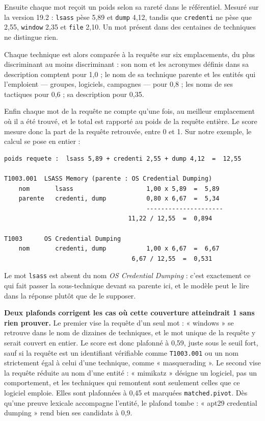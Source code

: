 Ensuite chaque mot reçoit un poids selon sa rareté dans le référentiel. Mesuré sur la version 19.2 : \texttt{lsass} pèse 5,89 et \texttt{dump} 4,12, tandis que \texttt{credenti} ne pèse que 2,55, \texttt{window} 2,35 et \texttt{file} 2,10. Un mot présent dans des centaines de techniques ne distingue rien.

Chaque technique est alors comparée à la requête sur six emplacements, du plus discriminant au moins discriminant : son nom et les acronymes définis dans sa description comptent pour 1,0 ; le nom de sa technique parente et les entités qui l'emploient --- groupes, logiciels, campagnes --- pour 0,8 ; les noms de ses tactiques pour 0,6 ; sa description pour 0,35.

Enfin chaque mot de la requête ne compte qu'une fois, au meilleur emplacement où il a été trouvé, et le total est rapporté au poids de la requête entière. Le score mesure donc la part de la requête retrouvée, entre 0 et 1. Sur notre exemple, le calcul se pose en entier :

\begin{verbatim}
poids requete :  lsass 5,89 + credenti 2,55 + dump 4,12  =  12,55

T1003.001  LSASS Memory (parente : OS Credential Dumping)
    nom       lsass                    1,00 x 5,89  =  5,89
    parente   credenti, dump           0,80 x 6,67  =  5,34
                                       ---------------------
                                  11,22 / 12,55  =  0,894

T1003      OS Credential Dumping
    nom       credenti, dump           1,00 x 6,67  =  6,67
                                   6,67 / 12,55  =  0,531
\end{verbatim}

Le mot \texttt{lsass} est absent du nom \emph{OS Credential Dumping} : c'est exactement ce qui fait passer la sous-technique devant sa parente ici, et le modèle peut le lire dans la réponse plutôt que de le supposer.

\textbf{Deux plafonds corrigent les cas où cette couverture atteindrait 1 sans rien prouver.} Le premier vise la requête d'un seul mot : « windows » se retrouve dans le nom de dizaines de techniques, et le mot unique de la requête y serait couvert en entier. Le score est donc plafonné à 0,59, juste sous le seuil fort, sauf si la requête est un identifiant vérifiable comme \texttt{T1003.001} ou un nom strictement égal à celui d'une technique, comme « masquerading ». Le second vise la requête réduite au nom d'une entité : « mimikatz » désigne un logiciel, pas un comportement, et les techniques qui remontent sont seulement celles que ce logiciel emploie. Elles sont plafonnées à 0,45 et marquées \texttt{matched.pivot}. Dès qu'une preuve lexicale accompagne l'entité, le plafond tombe : « apt29 credential dumping » rend bien ses candidats à 0,9.

